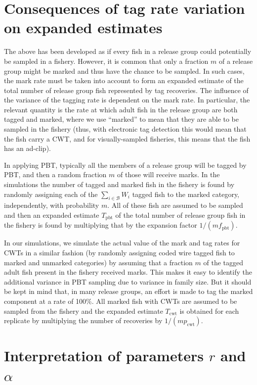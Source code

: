 \documentclass[11pt]{article}
\begin{document}
\section{Consequences of tag rate variation on expanded estimates}
The above has been developed as if every fish in a release group could potentially be 
sampled in a fishery.  However, it is common that only a fraction $m$ of a release
group might be marked and thus have the chance to be sampled.  In such cases, the mark 
rate must be taken into account to form an expanded estimate of the
total number of release group fish represented by tag recoveries.  
The influence of the variance of the tagging rate  is dependent on the mark rate.
In particular, the relevant quantity is the rate at which adult fish in the release group are
both tagged and marked, where we use ``marked'' to mean that they are able to be sampled in the 
fishery (thus, with electronic tag detection this would mean that the fish carry a CWT, and
for visually-sampled fisheries, this means that the fish has an ad-clip).  

In applying PBT, typically all the members of a release group will be tagged by PBT, and then a random fraction $m$ of those
will receive marks.  In the simulations the number of tagged and marked fish in the fishery is found by randomly assigning each of the $\sum_{i\in\mathcal{B}} W_i$ tagged fish to the marked category, independently, with probability $m$.  All of these fish are assumed to be sampled
and then an expanded estimate $T_\mathrm{pbt}$ of the total number of release group fish in the fishery is found by multiplying that by 
the expansion factor $1/(mf_\mathrm{pbt})$.

In our simulations, we simulate the actual value of the mark and tag rates for CWTs in a similar fashion (by randomly
assigning coded wire tagged fish to marked and unmarked categories) by assuming
that a fraction $m$ of the tagged adult fish present in the fishery received marks.  This makes it easy to identify the additional variance in
PBT sampling due to variance in family size.  But it should be kept in mind that, in many release groups, an effort is made to tag
the marked component at a rate of 100\%.  All marked fish with CWTs are assumed to be sampled from the fishery
and the expanded estimate $T_\mathrm{cwt}$ is obtained for each replicate by multiplying the
number of recoveries by $1/(mp_\mathrm{cwt})$.

 
\section{Interpretation of parameters $r$ and $\alpha$}
\end{document}
